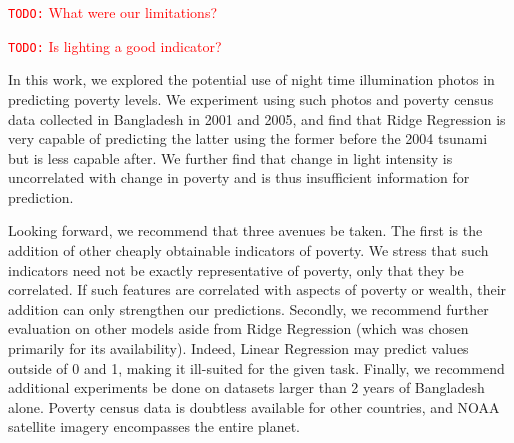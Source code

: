 \documentclass[10pt, letterpaper]{article}
\theoremstyle{plain}
\theoremstyle{definition}
\newcommand{\todo}[1]{
	\textcolor{red}{\texttt{TODO:} #1}
}
\begin{document}
\todo{What were our limitations?}

\todo{Is lighting a good indicator?}

  In this work, we explored the potential use of night time illumination photos in predicting poverty levels. We experiment using such photos and poverty census data collected in Bangladesh in 2001 and 2005, and find that Ridge Regression is very capable of predicting the latter using the former before the 2004 tsunami but is less capable after. We further find that change in light intensity is uncorrelated with change in poverty and is thus insufficient information for prediction.
  
  Looking forward, we recommend that three avenues be taken. The first is the addition of other cheaply obtainable indicators of poverty. We stress that such indicators need not be exactly representative of poverty, only that they be correlated. If such features are correlated with aspects of poverty or wealth, their addition can only strengthen our predictions.  Secondly, we recommend further evaluation on other models aside from Ridge Regression (which was chosen primarily for its availability).  Indeed, Linear Regression may predict values outside of 0 and 1, making it ill-suited for the given task.  Finally, we recommend additional experiments be done on datasets larger than 2 years of Bangladesh alone.  Poverty census data is doubtless available for other countries, and NOAA satellite imagery encompasses the entire planet. 

\end{document}
